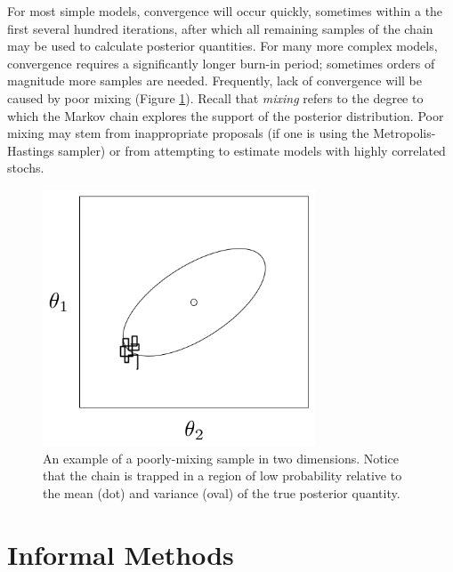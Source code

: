 \documentclass[]{book}
\begin{document}
For most simple models, convergence will occur quickly, sometimes within a the first several hundred iterations, after which all remaining samples of the chain may be used to calculate posterior quantities. For many more complex models, convergence requires a significantly longer burn-in period; sometimes  orders of magnitude more samples are needed. Frequently, lack of convergence will be caused by poor mixing (Figure \ref{fig:mix}). Recall that \emph{mixing} refers to the degree to which the Markov chain explores the support of the posterior distribution. Poor mixing may stem from inappropriate proposals (if one is using the Metropolis-Hastings sampler) or from attempting to estimate models with highly correlated stochs.

\begin{figure}[ht]
\begin{center}
\includegraphics[height=3in]{poor_mixing.png}
\caption{An example of a poorly-mixing sample in two dimensions. Notice that the chain is trapped in a region of low probability relative to the mean (dot) and variance (oval) of the true posterior quantity.}
\label{fig:mix}
\end{center}
\end{figure}

\section*{Informal Methods}
\end{document}
